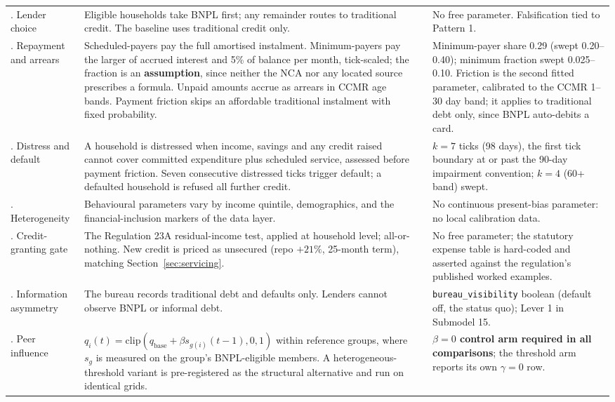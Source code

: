 \begin{longtable}{L{2.35cm}L{4.75cm}L{2.3cm}L{4.0cm}}
. Lender choice & Eligible households take \ac{BNPL} first; any remainder routes to traditional credit. The baseline uses traditional credit only. & \cite{ackert2025bnpl} & No free parameter. Falsification tied to Pattern 1. \\
. Repayment and arrears & Scheduled-payers pay the full amortised instalment. Minimum-payers pay the larger of accrued interest and 5\% of balance per month, tick-scaled; the fraction is an \textbf{assumption}, since neither the \ac{NCA} nor any located source prescribes a formula. Unpaid amounts accrue as arrears in \ac{CCMR} age bands. Payment friction skips an affordable traditional instalment with fixed probability. & \cite{Keys2019, Kuchler2021} & Minimum-payer share 0.29 (swept 0.20--0.40); minimum fraction swept 0.025--0.10. Friction is the second fitted parameter, calibrated to the \ac{CCMR} 1--30 day band; it applies to traditional debt only, since \ac{BNPL} auto-debits a card. \\
. Distress and default & A household is distressed when income, savings and any credit raised cannot cover committed expenditure plus scheduled service, assessed before payment friction. Seven consecutive distressed ticks trigger default; a defaulted household is refused all further credit. & \cite{madeira2018chile} & $k=7$ ticks (98 days), the first tick boundary at or past the 90-day impairment convention; $k=4$ (60+ band) swept. \\
. Heterogeneity & Behavioural parameters vary by income quintile, demographics, and the financial-inclusion markers of the data layer. & \cite{Keys2019} & No continuous present-bias parameter: no local calibration data. \\
. Credit-granting gate & The Regulation 23A residual-income test, applied at household level; all-or-nothing. New credit is priced as unsecured (repo $+21\%$, 25-month term), matching Section~\ref{sec:servicing}. & \cite{sa_ncr_affordability_2015} & No free parameter; the statutory expense table is hard-coded and asserted against the regulation's published worked examples. \\
. Information asymmetry & The bureau records traditional debt and defaults only. Lenders cannot observe \ac{BNPL} or informal debt. & \cite{nortonrose_bnpl_sa, transunion_cps_sa_2025} & \texttt{bureau\_visibility} boolean (default off, the status quo); Lever 1 in Submodel 15. \\
. Peer influence & $q_i(t) = \mathrm{clip}(q_{\text{base}} + \beta s_{g(i)}(t-1), 0, 1)$ within reference groups, where $s_g$ is measured on the group's \ac{BNPL}-eligible members. A heterogeneous-threshold variant is pre-registered as the structural alternative and run on identical grids. & \cite{ackert2025bnpl, cardaci2018inequality, granovetter1978threshold} & \textbf{$\beta=0$ control arm required in all comparisons}; the threshold arm reports its own $\gamma=0$ row. \\

\end{longtable}
